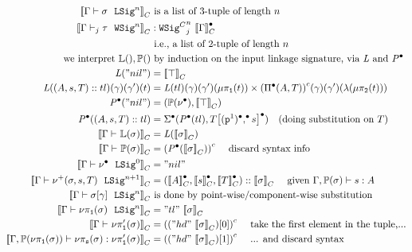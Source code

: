 \begin{align*}
  \denotesC{\goodSig{\Gm}{\lsig}{n}} & \text{ is a list of 3-tuple of length $n$  } \\
  \denotesC{\goodWSigU{j}{\Gm}{\wsig}{n}} &: \GMWSig{j}{\denotesCC{\Gm}}{n} \\ 
    &\text{ i.e., a list of 2-tuple of length $n$ } \\
  \text{we interpret }\TyLkg{}, \TyTkg{} & \text{ by induction on the input linkage signature, via } \mathit{L} \text{ and } \Glued{\mathit{P}}  \\ 
  \mathit{L}("nil") &=  \denotesC{\top}  \\
  \mathit{L}((A,s,T) :: tl)(\gm)(\gm')(t) &= {\mathit{L}(tl)}(\gm)(\gm')(\lkgproj{1}{t}) \times \Gmodel{\GluedPi{A}{T}}(\gm)(\gm')(\lam{\lkgproj{2}{t}})   \\
  \Glued{\mathit{P}}("nil") &= ( \TyTkg{\LSigEmp} , \denotesC{\top} )\\
  \Glued{\mathit{P}}((A,s,T) :: tl) &= \Glued{\Sigma}(\Glued{\mathit{P}}(tl), \Gsub{T}{\GSubstExt{{\GSubstWeak{1}}}{s}}) \quad \text{(doing substitution on $T$)} \\
  \denotesC{\goodType{\Gm}{\TyLkg{\lsig}}{}} &= {\mathit{L}(\denotesC{\lsig})} \\
  \denotesC{\goodType{\Gm}{\TyTkg{\lsig}}{}} &= \Gmodel{\Glued{\mathit{P}}(\denotesC{\lsig})} \quad \text{ discard syntax info}  \\
  \denotesC{\goodSig{\Gm}{\LSigEmp}{0}} &= "nil"\\ 
  \denotesC{\goodSig{\Gm}{\LSigAdd{\lsig}{s}{T}}{n+1}} &= (\denotesCC{A}, \denotesCC{s}, \denotesCC{T})::\denotesC{\lsig} \quad \text{ given } \goodTerm{\Gm, \TyTkg{\lsig}}{s}{A} \\ 
  \denotesC{\goodSig{\Gm}{\sub{\lsig}{\gm}}{n}} & \text{ is done by point-wise/component-wise substitution} \\
  \denotesC{\goodSig{\Gm}{\lsigproj{1}{\lsig}}{n}} &= "tl"~\denotesC{\lsig}\\ 
  \denotesC{\goodType{\Gm}{\lsigprojT{\lsig}}{}} &= \Gmodel{("hd"~\denotesC{\lsig})[0]} \quad \text{ take the first element in the tuple,...}\\ 
  \denotesC{\goodTerm{\Gm, \TyTkg{\lsigproj{1}{\lsig}}}{\lsigproj{s}{\lsig}}{\lsigprojT{\lsig}}} &= \Gmodel{("hd"~\denotesC{\lsig})[1]} \quad \text{  ... and discard syntax}\\ 

\end{align*}
